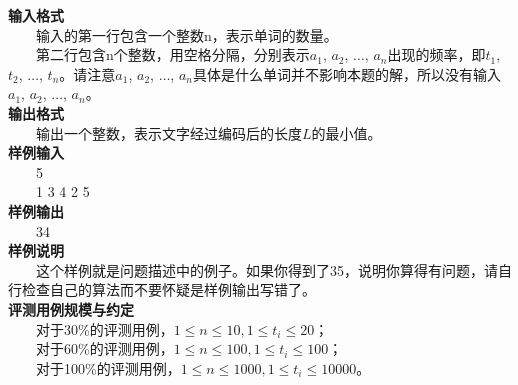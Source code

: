 \documentclass[11pt]{ctexart}
\begin{document}
\textbf{输入格式}\\
　　输入的第一行包含一个整数n，表示单词的数量。\\
　　第二行包含n个整数，用空格分隔，分别表示$a_{1}$, $a_{2}$, $\dots$, $a_{n}$出现的频率，即$t_{1}$, $t_{2}$, $\dots$, $t_{n}$。请注意$a_{1}$, $a_{2}$, $\dots$, $a_{n}$具体是什么单词并不影响本题的解，所以没有输入$a_{1}$, $a_{2}$, $\dots$, $a_{n}$。\\
\textbf{输出格式}\\
　　输出一个整数，表示文字经过编码后的长度$L$的最小值。\\
\textbf{样例输入}\\
　　5\\
　　1 3 4 2 5\\
\textbf{样例输出}\\
　　34\\
\textbf{样例说明}\\
　　这个样例就是问题描述中的例子。如果你得到了35，说明你算得有问题，请自行检查自己的算法而不要怀疑是样例输出写错了。\\
\textbf{评测用例规模与约定}\\
　　对于30\%的评测用例，$1 \leqslant n \leqslant 10, 1 \leqslant t_{i} \leqslant 20$；\\
　　对于60\%的评测用例，$1 \leqslant n \leqslant 100, 1 \leqslant t_{i} \leqslant 100$；\\
　　对于100\%的评测用例，$1 \leqslant n \leqslant 1000, 1 \leqslant t_{i} \leqslant 10000$。\\
\end{document}
